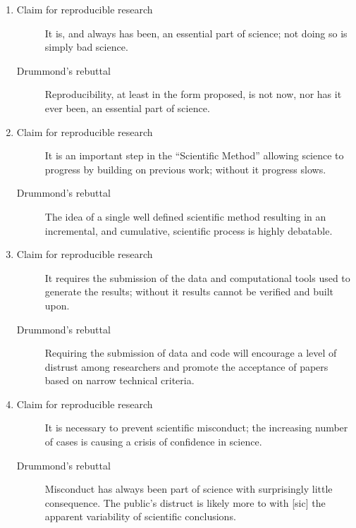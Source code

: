 \documentclass{book}
\begin{document}
\begin{enumerate}
\item 
\begin{description}
\item[Claim for reproducible research] It is, and always has been, an essential part of science; not doing so is simply bad science.
\item[Drummond's rebuttal] Reproducibility, at least in the form proposed, is not now, nor has it ever been, an essential part of science.
\end{description}
\item 
\begin{description}
\item[Claim for reproducible research] It is an important step in the ``Scientific Method'' allowing science to progress by building on previous work; without it progress slows.
\item[Drummond's rebuttal] The idea of a single well defined scientific method resulting in an incremental, and cumulative, scientific process is highly debatable.
\end{description}
\item 
\begin{description}
\item[Claim for reproducible research] It requires the submission of the data and computational tools used to generate the results; without it results cannot be verified and built upon.
\item[Drummond's rebuttal] Requiring the submission of data and code will encourage a level of distrust among researchers and promote the acceptance of papers based on narrow technical criteria.
\end{description}
\item 
\begin{description}
\item[Claim for reproducible research] It is necessary to prevent scientific misconduct; the increasing number of cases is causing a crisis of confidence in science.
\item[Drummond's rebuttal] Misconduct has always been part of science with surprisingly little consequence. The public's distruct is likely more to with [sic] the apparent variability of scientific conclusions.
\end{description}
\end{enumerate}
\end{document}

